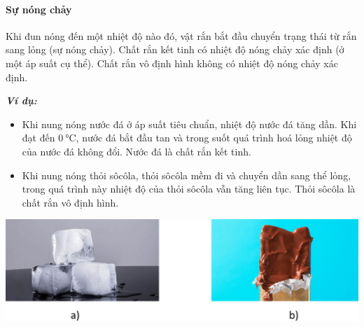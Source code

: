 \paragraph{Sự nóng chảy}
\begin{boxdn}
	Khi đun nóng đến một nhiệt độ nào đó, vật rắn bắt đầu chuyển trạng thái từ rắn sang lỏng (sự nóng chảy). Chất rắn kết tinh có nhiệt độ nóng chảy xác định (ở một áp suất cụ thể). Chất rắn vô định hình không có nhiệt độ nóng chảy xác định.\\
\end{boxdn}
\begin{boxvidu}
	\textbf{\textit{Ví dụ:}}
	\begin{itemize}
		\item Khi nung nóng nước đá ở áp suất tiêu chuẩn, nhiệt độ nước đá tăng dần. Khi đạt đến $\SI{0}{\celsius}$, nước đá bắt đầu tan và trong suốt quá trình hoá lỏng nhiệt độ của nước đá không đổi. Nước đá là chất rắn kết tinh.
		\item Khi nung nóng thỏi sôcôla, thỏi sôcôla mềm đi và chuyển dần sang thể lỏng, trong quá trình này nhiệt độ của thỏi sôcôla vẫn tăng liên tục. Thỏi sôcôla là chất rắn vô định hình.
	\end{itemize}
	\begin{center}
		\includegraphics[width=0.6\linewidth]{figs/VN12-Y24-PH-SYL-001-5}
	\end{center}
\end{boxvidu}
